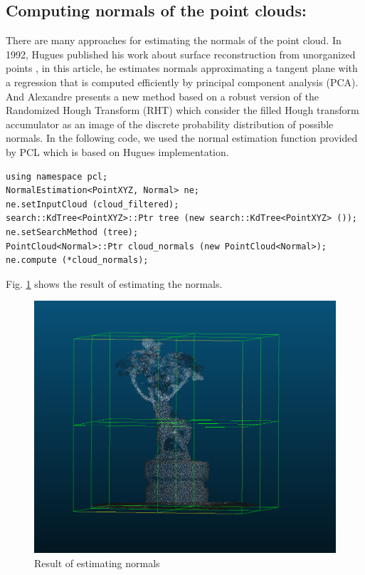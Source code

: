 \documentclass[runningheads,a4paper]{llncs}
\begin{document}
\subsection{Computing normals of the point clouds:}
There are many approaches for estimating the normals of the point cloud. In 1992, Hugues published his work about surface reconstruction from unorganized points \cite{10}, in this article, he estimates normals approximating a tangent
plane with a regression that is computed efficiently by principal component analysis (PCA). And Alexandre presents a new method based on a robust version of the Randomized Hough Transform (RHT) which consider the filled Hough
transform accumulator as an image of the discrete probability distribution of possible normals. In the following code, we used the normal estimation function provided by PCL which is based on Hugues implementation.

\begin{lstlisting}
using namespace pcl;
NormalEstimation<PointXYZ, Normal> ne;
ne.setInputCloud (cloud_filtered);
search::KdTree<PointXYZ>::Ptr tree (new search::KdTree<PointXYZ> ());
ne.setSearchMethod (tree);
PointCloud<Normal>::Ptr cloud_normals (new PointCloud<Normal>);
ne.compute (*cloud_normals);
\end{lstlisting}
Fig. \ref{fig:estimate-normal} shows the result of estimating the normals.

\begin{figure}
\centering
\includegraphics[scale=0.4]{estimate_normal.PNG}
\caption{Result of estimating normals}
\label{fig:estimate-normal}
\end{figure}
\end{document}
